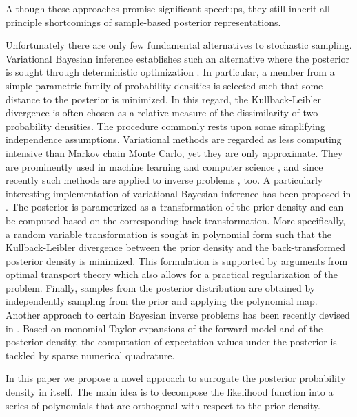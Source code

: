 Although these approaches promise significant speedups, they still inherit all principle shortcomings of sample-based posterior representations.
\par %
Unfortunately there are only few fundamental alternatives to stochastic sampling.
Variational Bayesian inference establishes such an alternative where the posterior is sought through deterministic optimization \cite{Bayesian:Ormerod2010,Bayesian:Fox2012,Bayesian:Sun2013}.
In particular, a member from a simple parametric family of probability densities is selected such that some distance to the posterior is minimized.
In this regard, the Kullback-Leibler divergence is often chosen as a relative measure of the dissimilarity of two probability densities.
The procedure commonly rests upon some simplifying independence assumptions.
Variational methods are regarded as less computing intensive than Markov chain Monte Carlo, yet they are only approximate.
They are prominently used in machine learning and computer science \cite{Bayesian:Jordan1999,Bayesian:Jaakkola2000},
and since recently such methods are applied to inverse problems \cite{Bayesian:Chappell2009,Bayesian:Jin2010}, too.
A particularly interesting implementation of variational Bayesian inference has been proposed in \cite{Mapping:ElMoselhy2012}.
The posterior is parametrized as a transformation of the prior density and can be computed based on the corresponding back-transformation.
More specifically, a random variable transformation is sought in polynomial form
such that the Kullback-Leibler divergence between the prior density and the back-transformed posterior density is minimized.
This formulation is supported by arguments from optimal transport theory which also allows for a practical regularization of the problem.
Finally, samples from the posterior distribution are obtained by independently sampling from the prior and applying the polynomial map.
Another approach to certain Bayesian inverse problems has been recently devised in \cite{Bayesian:Schwab2012,Bayesian:Schillings2013}.
Based on monomial Taylor expansions of the forward model and of the posterior density, the computation of expectation values under the posterior is tackled by sparse numerical quadrature.
\par %
In this paper we propose a novel approach to surrogate the posterior probability density in itself.
The main idea is to decompose the likelihood function into a series of polynomials that are orthogonal with respect to the prior density.
